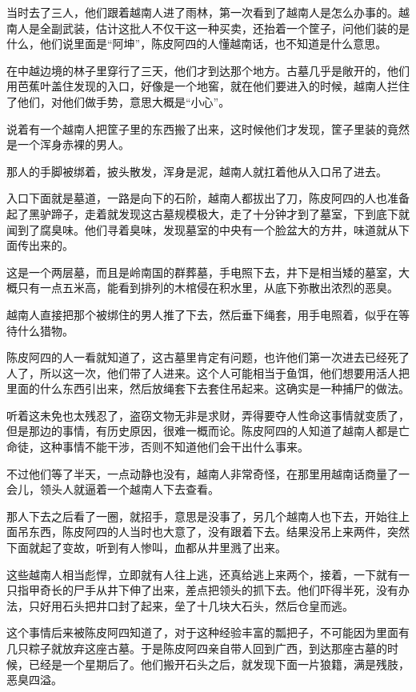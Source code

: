 当时去了三人，他们跟着越南人进了雨林，第一次看到了越南人是怎么办事的。越南人是全副武装，估计这批人不仅干这一种买卖，还抬着一个筐子，问他们装的是什么，他们说里面是“阿坤”，陈皮阿四的人懂越南话，也不知道是什么意思。

在中越边境的林子里穿行了三天，他们才到达那个地方。古墓几乎是敞开的，他们用芭蕉叶盖住发现的入口，好像是一个地窖，就在他们要进入的时候，越南人拦住了他们，对他们做手势，意思大概是“小心”。

说着有一个越南人把筐子里的东西搬了出来，这时候他们才发现，筐子里装的竟然是一个浑身赤裸的男人。

那人的手脚被绑着，披头散发，浑身是泥，越南人就扛着他从入口吊了进去。

入口下面就是墓道，一路是向下的石阶，越南人都拔出了刀，陈皮阿四的人也准备起了黑驴蹄子，走着就发现这古墓规模极大，走了十分钟才到了墓室，下到底下就闻到了腐臭味。他们寻着臭味，发现墓室的中央有一个脸盆大的方井，味道就从下面传出来的。

这是一个两层墓，而且是岭南国的群葬墓，手电照下去，井下是相当矮的墓室，大概只有一点五米高，能看到排列的木棺侵在积水里，从底下弥散出浓烈的恶臭。

越南人直接把那个被绑住的男人推了下去，然后垂下绳套，用手电照着，似乎在等待什么猎物。

陈皮阿四的人一看就知道了，这古墓里肯定有问题，也许他们第一次进去已经死了人了，所以这一次，他们带了人进来。这个人可能相当于鱼饵，他们想要用活人把里面的什么东西引出来，然后放绳套下去套住吊起来。这确实是一种捕尸的做法。

听着这未免也太残忍了，盗窃文物无非是求财，弄得要夺人性命这事情就变质了，但是那边的事情，有历史原因，很难一概而论。陈皮阿四的人知道了越南人都是亡命徒，这种事情不能干涉，否则不知道他们会干出什么事来。

不过他们等了半天，一点动静也没有，越南人非常奇怪，在那里用越南话商量了一会儿，领头人就逼着一个越南人下去查看。

那人下去之后看了一圈，就招手，意思是没事了，另几个越南人也下去，开始往上面吊东西，陈皮阿四的人当时也大意了，没有跟着下去。结果没吊上来两件，突然下面就起了变故，听到有人惨叫，血都从井里溅了出来。

这些越南人相当彪悍，立即就有人往上逃，还真给逃上来两个，接着，一下就有一只指甲奇长的尸手从井下伸了出来，差点把领头的抓下去。他们吓得半死，没有办法，只好用石头把井口封了起来，垒了十几块大石头，然后仓皇而逃。

这个事情后来被陈皮阿四知道了，对于这种经验丰富的瓢把子，不可能因为里面有几只粽子就放弃这座古墓。于是陈皮阿四亲自带人回到广西，到达那座古墓的时候，已经是一个星期后了。他们搬开石头之后，就发现下面一片狼籍，满是残肢，恶臭四溢。

